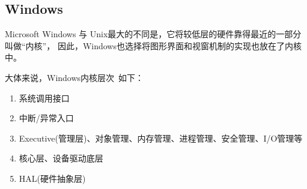 \subsection{Windows}

Microsoft Windows 与 Unix最大的不同是，它将较低层的硬件靠得最近的一部分叫做“内核”，
因此，Windows也选择将图形界面和视窗机制的实现也放在了内核中。

大体来说，Windows内核层次~\cite{毛德操2005windows}如下：
\begin{enumerate}
  \item 系统调用接口
  \item 中断/异常入口
  \item Executive(管理层)、对象管理、内存管理、进程管理、安全管理、I/O管理等
  \item 核心层、设备驱动底层
  \item HAL(硬件抽象层)
\end{enumerate}